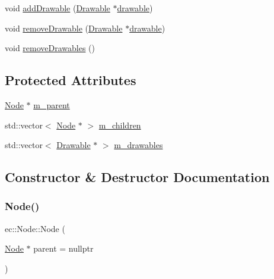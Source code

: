 \begin{DoxyCompactItemize}
\item 
void \mbox{\hyperlink{classec_1_1_node_aef615bcf1c24225838e00c15d03dc707}{add\+Drawable}} (\mbox{\hyperlink{classec_1_1_drawable}{Drawable}} $\ast$\mbox{\hyperlink{_resource_type_8h_a0e08bf97f986b1083a00d3f004fb04f7}{drawable}})
\item 
void \mbox{\hyperlink{classec_1_1_node_a9cd4bc1df04ee734dd11ebe0b9079434}{remove\+Drawable}} (\mbox{\hyperlink{classec_1_1_drawable}{Drawable}} $\ast$\mbox{\hyperlink{_resource_type_8h_a0e08bf97f986b1083a00d3f004fb04f7}{drawable}})
\item 
void \mbox{\hyperlink{classec_1_1_node_a57fd7f0d158527df372880399ca48002}{remove\+Drawables}} ()
\end{DoxyCompactItemize}
\subsection*{Protected Attributes}
\begin{DoxyCompactItemize}
\item 
\mbox{\hyperlink{classec_1_1_node}{Node}} $\ast$ \mbox{\hyperlink{classec_1_1_node_a9f5373bd3ba5bfed53894223adcfe791}{m\+\_\+parent}}
\item 
std\+::vector$<$ \mbox{\hyperlink{classec_1_1_node}{Node}} $\ast$ $>$ \mbox{\hyperlink{classec_1_1_node_a648e1758013c7fc5899cbff2f8fe41fa}{m\+\_\+children}}
\item 
std\+::vector$<$ \mbox{\hyperlink{classec_1_1_drawable}{Drawable}} $\ast$ $>$ \mbox{\hyperlink{classec_1_1_node_aa9f624971a4906674148117ba4442c01}{m\+\_\+drawables}}
\end{DoxyCompactItemize}


\subsection{Constructor \& Destructor Documentation}
\mbox{\label{classec_1_1_node_a38582758606734f5f3a0e5c6d3dc0200}} 
\subsubsection{\texorpdfstring{Node()}{Node()}}
{\footnotesize\ttfamily ec\+::\+Node\+::\+Node (\begin{DoxyParamCaption}\item[{\mbox{\hyperlink{classec_1_1_node}{Node}} $\ast$}]{parent = {\ttfamily nullptr} }\end{DoxyParamCaption})\hspace{0.3cm}{\ttfamily [explicit]}}

